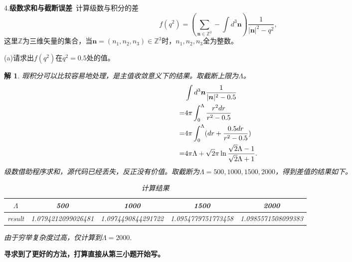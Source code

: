 \documentclass[10pt]{ctexart}
\newtheorem*{solution}{解}
\begin{document}
4.\textbf{级数求和与截断误差}\  计算级数与积分的差
$$f(q^2)=\left(\sum\limits_{\bm{n}\in\mathbb{Z}^3}-\int d^3\bm{n}\right)\frac{1}{\lvert\bm{n}\rvert^2-q^2},$$
这里$\mathbb{Z}$为三维矢量的集合，当$\bm{n}=(n_1,n_2,n_3)\in\mathbb{Z}^3$时，$n_1,n_2,n_3$全为整数。

(a)请求出$f(q^2)$在$q^2=0.5$处的值。
\begin{solution}
    瑕积分可以比较容易地处理，是主值收敛意义下的结果。取截断上限为$\Lambda$。
    \begin{align}
        &\int d^3\bm{n}\frac{1}{\lvert\bm{n}\rvert^2-0.5}\notag\\
        =&4\pi\int_{0}^{\Lambda}\frac{r^2dr}{r^2-0.5}\notag\\
        =&4\pi\int_0^{\Lambda}(dr+\frac{0.5dr}{r^2-0.5})\notag\\
        =&4\pi \Lambda+\sqrt{2}\pi\ln{\frac{\sqrt{2}\Lambda-1}{\sqrt{2}\Lambda+1}}.\notag
    \end{align}
    级数借助程序求和，源代码已经丢失，反正没有价值。取截断为$\Lambda=500,1000,1500,2000$，得到差值的结果如下。
    \begin{table}[H]
        \centering
        \begin{tabular}{ccccc}
            \toprule
            $\Lambda$ & 500 & 1000 & 1500 & 2000 \\
            \midrule
            result & 1.0794212099026481 & 1.0974490844291722 & 1.0954779751773458 & 1.0985571508099383\\
            \bottomrule
        \end{tabular}
        \caption{计算结果}
    \end{table}
    由于穷举复杂度过高，仅计算到$\Lambda=2000.$
\end{solution}

\textbf{寻求到了更好的方法，打算直接从第三小题开始写。}
\end{document}
